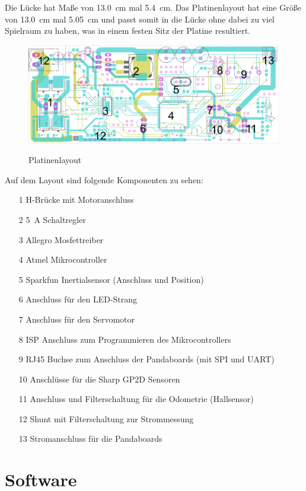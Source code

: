 Die Lücke hat Maße von \SI{13,0}{\centi\meter} mal \SI{5,4}{\centi\meter}. Das Platinenlayout hat eine Größe von  \SI{13,0}{\centi\meter} mal \SI{5,05}{\centi\meter} und passt somit in die Lücke ohne dabei zu viel Spielraum zu haben, 
was in einem festen Sitz der Platine resultiert. 

\begin{figure}[H]
\centering
\includegraphics[width=.8\textwidth]{platinen_layout_scr.png}\\
\caption{Platinenlayout}%
\label{fig:layout}
\end{figure}


Auf dem Layout sind folgende Komponenten zu sehen:
\begin{itemize}
\setlength{\parskip}{0pt}
 \item [1] H-Brücke mit Motoranschluss
 \item [2] \SI{5}{\ampere} Schaltregler
 \item [3] Allegro Mosfettreiber
 \item [4] Atmel Mikrocontroller
 \item [5] Sparkfun Inertialsensor (Anschluss und Position)
 \item [6] Anschluss für den LED-Strang
 \item [7] Anschluss für den Servomotor
 \item [8] ISP Anschluss zum Programmieren des Mikrocontrollers
 \item [9] RJ45 Buchse zum Anschluss der Pandaboards (mit SPI und U\-ART)
 \item [10] Anschlüsse für die Sharp GP2D Sensoren 
 \item [11] Anschluss und Filterschaltung für die Odometrie (Hallsensor)
 \item [12] Shunt mit Filterschaltung zur Strommessung
 \item [13] Stromanschluss für die Pandaboards
\end{itemize}



\section{Software}


